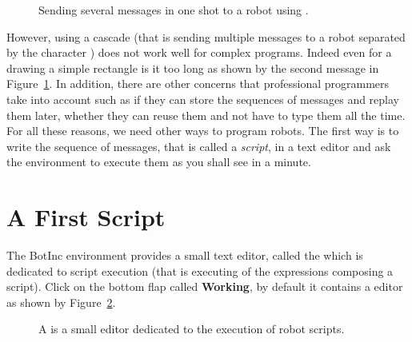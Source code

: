 \begin{figure}[!h]
\caption{Sending several messages in one shot to a robot using \ct{;}. \label{fig:cascading}}
\end{figure}

However, using a cascade (that is sending multiple messages to a robot separated by the character \ct{;}) does not work well for complex programs. Indeed even for a drawing a simple rectangle is it too long as shown by the second message in Figure~\ref{fig:cascading}. In addition, there are other concerns that professional programmers take into account such as if they can store the sequences of messages and replay them later, whether they can reuse them and not have to type them all the time. For all these reasons, we need other ways to program robots. The first way is to write the sequence of messages, that is called a \emph{script},  in a text editor and ask the environment to execute them as you shall see in a minute. 

\section{A First Script}
The BotInc environment provides a small text editor, called the \tw which is dedicated to script execution (that is executing of the expressions composing a script). Click on the bottom flap called \textbf{Working}, by default it contains a \tw editor as shown by Figure~\ref{fig:TurtleWorkspace}. 

\begin{figure}[!h]
\caption{A \tw is a small editor dedicated to the execution of robot scripts. \label{fig:TurtleWorkspace}}
\end{figure}

